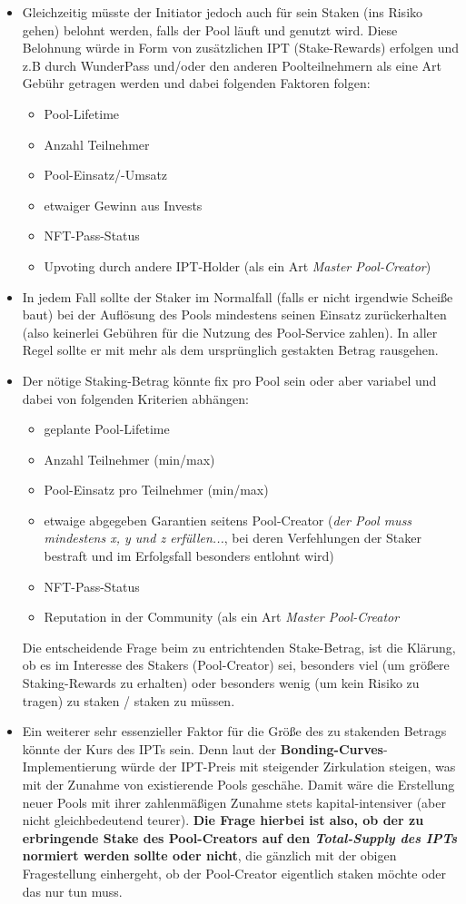 \begin{itemize}
\begin{itemize}
  	\item Gleichzeitig müsste der Initiator jedoch auch für sein Staken (ins Risiko gehen) belohnt werden, falls der Pool läuft und genutzt wird. Diese Belohnung würde in Form von zusätzlichen IPT (Stake-Rewards) erfolgen und z.B durch WunderPass und/oder den anderen Poolteilnehmern als eine Art Gebühr getragen werden und dabei folgenden Faktoren folgen:
  	\begin{itemize}
  		\item Pool-Lifetime
  		\item Anzahl Teilnehmer
  		\item Pool-Einsatz/-Umsatz
  		\item etwaiger Gewinn aus Invests
  		\item NFT-Pass-Status
  		\item Upvoting durch andere IPT-Holder (als ein Art \textit{Master Pool-Creator})
  	\end{itemize}
  	\item In jedem Fall sollte der Staker im Normalfall (falls er nicht irgendwie Scheiße baut) bei der Auflösung des Pools mindestens seinen Einsatz zurückerhalten (also keinerlei Gebühren für die Nutzung des Pool-Service zahlen). In aller Regel sollte er mit mehr als dem ursprünglich gestakten Betrag rausgehen.
  	\item Der nötige Staking-Betrag könnte fix pro Pool sein oder aber variabel und dabei von folgenden Kriterien abhängen:
  	\begin{itemize}
  		\item geplante Pool-Lifetime
  		\item Anzahl Teilnehmer (min/max)
  		\item Pool-Einsatz pro Teilnehmer (min/max)
  		\item etwaige abgegeben Garantien seitens Pool-Creator (\textit{der Pool muss mindestens x, y und z erfüllen...}, bei deren Verfehlungen der Staker bestraft und im Erfolgsfall besonders entlohnt wird)
  		\item NFT-Pass-Status
  		\item Reputation in der Community (als ein Art \textit{Master Pool-Creator}
  	\end{itemize}
  	Die entscheidende Frage beim zu entrichtenden Stake-Betrag, ist die Klärung, ob es im Interesse des Stakers (Pool-Creator) sei, besonders viel (um größere Staking-Rewards zu erhalten) oder besonders wenig (um kein Risiko zu tragen) zu staken / staken zu müssen.
  	\item Ein weiterer sehr essenzieller Faktor für die Größe des zu stakenden Betrags könnte der Kurs des IPTs sein. Denn laut der \textbf{Bonding-Curves}-Implementierung würde der IPT-Preis mit steigender Zirkulation steigen, was mit der Zunahme von existierende Pools geschähe. Damit wäre die Erstellung neuer Pools mit ihrer zahlenmäßigen Zunahme stets kapital-intensiver (aber nicht gleichbedeutend teurer). \textbf{Die Frage hierbei ist also, ob der zu erbringende Stake des Pool-Creators auf den \textit{Total-Supply des IPTs} normiert werden sollte oder nicht}, die gänzlich mit der obigen Fragestellung einhergeht, ob der Pool-Creator eigentlich staken möchte oder das nur tun muss.

\end{itemize}
\end{itemize}
